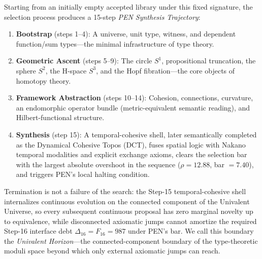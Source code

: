 \documentclass[11pt,a4paper]{article}
\theoremstyle{plain}
\theoremstyle{definition}
\theoremstyle{remark}
\begin{document}
Starting from an initially empty accepted library under this fixed signature, the selection process produces a 15-step \emph{PEN Synthesis Trajectory}:
\begin{enumerate}[nosep]
    \item \textbf{Bootstrap} (steps 1--4): A universe, unit type, witness, and dependent function/sum types---the minimal infrastructure of type theory.
    \item \textbf{Geometric Ascent} (steps 5--9): The circle $S^1$, propositional truncation, the sphere $S^2$, the H-space $S^3$, and the Hopf fibration---the core objects of homotopy theory.
    \item \textbf{Framework Abstraction} (steps 10--14): Cohesion, connections, curvature, an endomorphic operator bundle (metric-equivalent semantic reading), and Hilbert-functional structure.
    \item \textbf{Synthesis} (step 15): A temporal-cohesive shell, later semantically completed as the Dynamical Cohesive Topos (DCT), fuses spatial logic with Nakano temporal modalities and explicit exchange axioms, clears the selection bar with the largest absolute overshoot in the sequence ($\rho = 12.88$, bar $= 7.40$), and triggers PEN's local halting condition.
\end{enumerate}
Termination is not a failure of the search: the Step-15 temporal-cohesive shell internalizes continuous evolution on the connected component of the Univalent Universe, so every subsequent continuous proposal has zero marginal novelty up to equivalence, while disconnected axiomatic jumps cannot amortize the required Step-16 interface debt $\Delta_{16}=F_{16}=987$ under PEN's bar.
We call this boundary the \emph{Univalent Horizon}---the connected-component boundary of the type-theoretic moduli space beyond which only external axiomatic jumps can reach.
\end{document}
